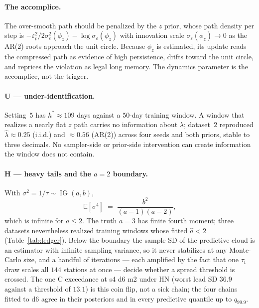\documentclass[11pt]{article}
\DeclareMathOperator{\IG}{IG}
\newcommand{\E}{\mathbb{E}}
\begin{document}
\paragraph{The accomplice.} The over-smooth path should be penalized by
the $z$ prior, whose path density per step is
$-\varepsilon_t^2/2\sigma_\varepsilon^2(\phi_z) - \log
\sigma_\varepsilon(\phi_z)$ with innovation scale
$\sigma_\varepsilon(\phi_z) \to 0$ as the AR(2) roots approach the unit
circle. Because $\phi_z$ is estimated, its update reads the compressed
path as evidence of high persistence, drifts toward the unit circle, and
reprices the violation as legal long memory. The dynamics parameter is
the accomplice, not the trigger.

\paragraph{U --- under-identification.} Setting~$5$ has
$h^\ast \approx 109$ days against a $50$-day training window. A window
that realizes a nearly flat $z$ path carries no information about
$\lambda$; dataset~$2$ reproduced $\hat\lambda \approx 0.25$ (i.i.d.)
and $\approx 0.56$ (AR(2)) across four seeds and both priors, stable to
three decimals. No sampler-side or prior-side intervention can create
information the window does not contain.

\paragraph{H --- heavy tails and the $a = 2$ boundary.}
\label{sec:heavy}
With $\sigma^2 = 1/\tau \sim \IG(a, b)$,
\begin{equation}
  \E[\sigma^4] \;=\; \frac{b^2}{(a-1)(a-2)},
  \label{eq:fourth}
\end{equation}
which is infinite for $a \le 2$. The truth $a = 3$ has finite fourth
moment; three datasets nevertheless realized training windows whose
fitted $\hat a < 2$ (Table~\ref{tab:ledger}). Below the boundary the
sample SD of the predictive cloud is an estimator with infinite sampling
variance, so it never stabilizes at any Monte-Carlo size, and a
handful of iterations --- each amplified by the fact that one $\tau_t$
draw scales all $144$ stations at once --- decide whether a spread
threshold is crossed. The one C exceedance at s4 d6 m2 under HN (worst
lead SD $36.9$ against a threshold of $13.1$) is this coin flip, not a
sick chain; the four chains fitted to d6 agree in their posteriors and
in every predictive quantile up to $q_{99.9}$.
\end{document}

